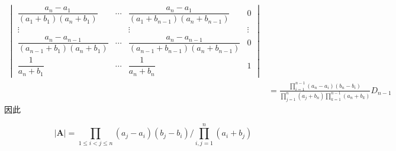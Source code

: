 {\begin{solution}
\begin{align*}
\begin{vmatrix}
                \dfrac{a_n-a_1}{\left(a_1+b_1\right)
                \left(a_n+b_1\right)} & \cdots             &
                \dfrac{a_n-a_1}{\left(
                    a_1+b_{n-1}
                    \right)\left(
                    a_n+b_{n-1}
                \right)}              & 0                                    \\
                \vdots                &                    & \vdots & \vdots \\
                \dfrac{a_n-a_{n-1}}{\left(
                a_{n-1}+b_1
                \right)\left(
                a_n+b_1
                \right)}              & \cdots             &
                \dfrac{a_n-a_{n-1}}{\left(
                a_{n-1}+b_{n-1}
                \right)\left(
                a_n+b_{n-1}
                \right)}              & 0                                    \\[1em]
                \dfrac{1}{a_n+b_1}    &
                \cdots                & \dfrac{1}{a_n+b_n} & 1
            \end{vmatrix}                       \\
                & =
            \frac{
                \prod\limits_{i=1}^{n-1}
                \left(a_n-a_i\right)\left(
                b_n-b_i
                \right)
            }{\prod\limits_{j=1}^{n}
                \left(a_j+b_n\right)\prod\limits_{k=1}^{n-1}\left(
                a_n+b_k
                \right)}D_{n-1}
        \end{align*}
        因此

        \[
            \left|\bm{A}\right|
            =
            \prod_{1\leqslant i < j\leqslant n}
            \left(a_j-a_i\right)\left(
            b_j-b_i
            \right)
            \Bigg/
            \prod_{i,j=1}^{n}\left(a_i+b_j
            \right)
        \]
    \end{solution}
}
